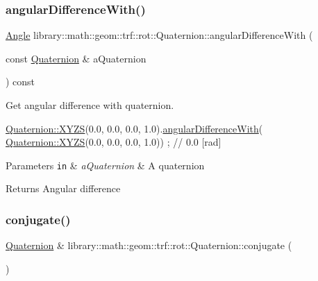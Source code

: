 \subsubsection{\texorpdfstring{angular\+Difference\+With()}{angularDifferenceWith()}}
{\footnotesize\ttfamily \hyperlink{classlibrary_1_1math_1_1geom_1_1_angle}{Angle} library\+::math\+::geom\+::trf\+::rot\+::\+Quaternion\+::angular\+Difference\+With (\begin{DoxyParamCaption}\item[{const \hyperlink{classlibrary_1_1math_1_1geom_1_1trf_1_1rot_1_1_quaternion}{Quaternion} \&}]{a\+Quaternion }\end{DoxyParamCaption}) const}



Get angular difference with quaternion. 


\begin{DoxyCode}
\hyperlink{classlibrary_1_1math_1_1geom_1_1trf_1_1rot_1_1_quaternion_afff9523c7dcbfbbc521736121e62ad41}{Quaternion::XYZS}(0.0, 0.0, 0.0, 1.0).\hyperlink{classlibrary_1_1math_1_1geom_1_1trf_1_1rot_1_1_quaternion_a82c585870a5c5833ae8869c8e193d94a}{angularDifferenceWith}(
      \hyperlink{classlibrary_1_1math_1_1geom_1_1trf_1_1rot_1_1_quaternion_afff9523c7dcbfbbc521736121e62ad41}{Quaternion::XYZS}(0.0, 0.0, 0.0, 1.0)) ; \textcolor{comment}{// 0.0 [rad]}
\end{DoxyCode}



\begin{DoxyParams}[1]{Parameters}
\mbox{\tt in}  & {\em a\+Quaternion} & A quaternion \\
\hline
\end{DoxyParams}
\begin{DoxyReturn}{Returns}
Angular difference 
\end{DoxyReturn}
\mbox{\label{classlibrary_1_1math_1_1geom_1_1trf_1_1rot_1_1_quaternion_a4c584b96ce248b069a85adb1c5abd74c}} 
\subsubsection{\texorpdfstring{conjugate()}{conjugate()}}
{\footnotesize\ttfamily \hyperlink{classlibrary_1_1math_1_1geom_1_1trf_1_1rot_1_1_quaternion}{Quaternion} \& library\+::math\+::geom\+::trf\+::rot\+::\+Quaternion\+::conjugate (\begin{DoxyParamCaption}{ }\end{DoxyParamCaption})}



